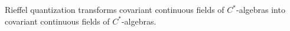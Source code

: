 \begin{Theorem}\label{mein}
Rieffel quantization transforms covariant continuous fields of $C^*$-algebras into
covariant continuous fields of $C^*$-algebras.
\end{Theorem}

